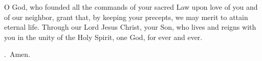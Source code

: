\lettrine[lines=3]{O}{} God, who founded all the commands of your sacred Law upon love of you and of our neighbor, grant that, by keeping your precepts, we may merit to attain eternal life. Through our Lord Jesus Christ, your Son, who lives and reigns with you in the unity of the Holy Spirit, one God, for ever and ever. \par \Rbar.~Amen.
